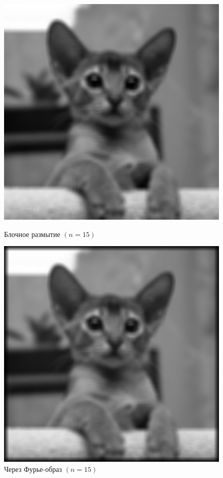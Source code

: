 \documentclass[a4paper]{article}
\begin{document}
\begin{figure}[H]
    \hspace{5em}
    \begin{minipage}{0.35\textwidth}
        \includegraphics[width=\textwidth]{sources/2second/block_15.png}
        \caption{Блочное размытие $(n = 15)$}
    \end{minipage}\hfill
    \begin{minipage}{0.35\textwidth}
        \includegraphics[width=\textwidth]{sources/2second/block_fft_15.png}
        \caption{Через Фурье-образ $(n = 15)$}
    \end{minipage}
    \hspace{5em}
\end{figure}
\end{document}
